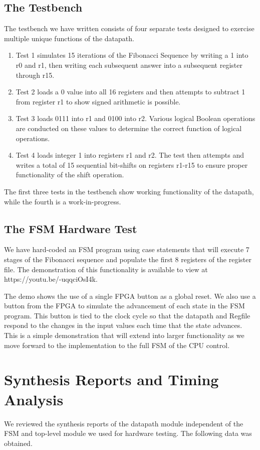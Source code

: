 \documentclass[conference]{IEEEtran}
\begin{document}
\subsection{The Testbench}
The testbench we have written consists of four separate tests designed to exercise multiple unique functions of the datapath.
\begin{enumerate}
    \item Test 1 simulates 15 iterations of the Fibonacci Sequence by writing a 1 into r0 and r1, then writing each subsequent answer into a subsequent register through r15.
    \item Test 2 loads a 0 value into all 16 registers and then attempts to subtract 1 from register r1 to show signed arithmetic is possible.
    \item Test 3 loads 0111 into r1 and 0100 into r2. Various logical Boolean operations are conducted on these values to determine the correct function of logical operations.
    \item Test 4 loads integer 1 into registers r1 and r2. The test then attempts and writes a total of 15 sequential bit-shifts on registers r1-r15 to ensure proper functionality of the shift operation.
\end{enumerate}

The first three tests in the testbench show working functionality of the datapath, while the fourth is a work-in-progress.

\subsection{The FSM Hardware Test}
We have hard-coded an FSM program using case statements that will execute 7 stages of the Fibonacci sequence and populate the first 8 registers of the register file. The demonstration of this functionality is available to view at https://youtu.be/-uqqciOsI4k.

The demo shows the use of a single FPGA button as a global reset. We also use a button from the FPGA to simulate the advancement of each state in the FSM program. This button is tied to the clock cycle so that the datapath and Regfile respond to the changes in the input values each time that the state advances. This is a simple demonstration that will extend into larger functionality as we move forward to the implementation to the full FSM of the CPU control.

\section{Synthesis Reports and Timing Analysis}
We reviewed the synthesis reports of the datapath module independent of the FSM and top-level module we used for hardware testing. The following data was obtained.
\end{document}
